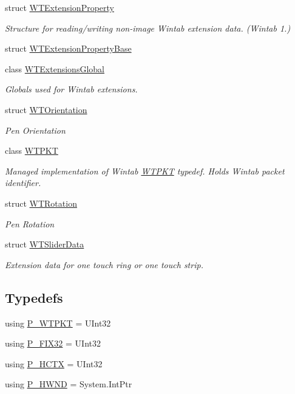 \begin{DoxyCompactItemize}
struct \mbox{\hyperlink{struct_wintab_d_n_1_1_w_t_extension_property}{W\+T\+Extension\+Property}}
\begin{DoxyCompactList}\small\item\em Structure for reading/writing non-\/image Wintab extension data. (Wintab 1.) \end{DoxyCompactList}\item 
struct \mbox{\hyperlink{struct_wintab_d_n_1_1_w_t_extension_property_base}{W\+T\+Extension\+Property\+Base}}
\item 
class \mbox{\hyperlink{class_wintab_d_n_1_1_w_t_extensions_global}{W\+T\+Extensions\+Global}}
\begin{DoxyCompactList}\small\item\em Globals used for Wintab extensions. \end{DoxyCompactList}\item 
struct \mbox{\hyperlink{struct_wintab_d_n_1_1_w_t_orientation}{W\+T\+Orientation}}
\begin{DoxyCompactList}\small\item\em Pen Orientation \end{DoxyCompactList}\item 
class \mbox{\hyperlink{class_wintab_d_n_1_1_w_t_p_k_t}{W\+T\+P\+KT}}
\begin{DoxyCompactList}\small\item\em Managed implementation of Wintab \mbox{\hyperlink{class_wintab_d_n_1_1_w_t_p_k_t}{W\+T\+P\+KT}} typedef. Holds Wintab packet identifier. \end{DoxyCompactList}\item 
struct \mbox{\hyperlink{struct_wintab_d_n_1_1_w_t_rotation}{W\+T\+Rotation}}
\begin{DoxyCompactList}\small\item\em Pen Rotation \end{DoxyCompactList}\item 
struct \mbox{\hyperlink{struct_wintab_d_n_1_1_w_t_slider_data}{W\+T\+Slider\+Data}}
\begin{DoxyCompactList}\small\item\em Extension data for one touch ring or one touch strip. \end{DoxyCompactList}\end{DoxyCompactItemize}
\subsection*{Typedefs}
\begin{DoxyCompactItemize}
\item 
using \mbox{\hyperlink{namespace_wintab_d_n_a465f8a123fa56040cd62f6a4df2707aa}{P\+\_\+\+W\+T\+P\+KT}} = U\+Int32
\item 
using \mbox{\hyperlink{namespace_wintab_d_n_ae94d0383e02caff0b36afc0b8aa1cd32}{P\+\_\+\+F\+I\+X32}} = U\+Int32
\item 
using \mbox{\hyperlink{namespace_wintab_d_n_a9ae61204cd14d7ef23008991d1fb6dff}{P\+\_\+\+H\+C\+TX}} = U\+Int32
\item 
using \mbox{\hyperlink{namespace_wintab_d_n_a33ba63b3dc16db27638a5f294140f53a}{P\+\_\+\+H\+W\+ND}} = System.\+Int\+Ptr
\end{DoxyCompactItemize}
